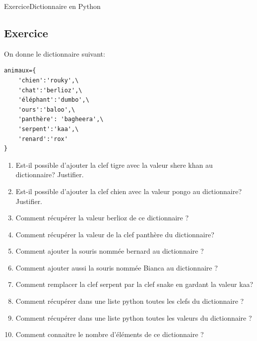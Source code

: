 \documentclass[11pt,a4paper]{article}
\newcounter{numexo}
\begin{document}
\begin{NSI}
{Exercice}{Dictionnaire en Python}
\end{NSI}


\addtocounter{numexo}{1}
\subsection*{\Large Exercice \thenumexo}
On donne le dictionnaire suivant:

\begin{lstlisting}
animaux={
	'chien':'rouky',\
	'chat':'berlioz',\
	'éléphant':'dumbo',\
	'ours':'baloo',\
	'panthère': 'bagheera',\
	'serpent':'kaa',\
	'renard':'rox'
}
\end{lstlisting}

\begin{enumerate}
\item Est-il possible d'ajouter la clef \textsf{tigre} avec la valeur \textsf{shere khan} au dictionnaire? Justifier.
\item Est-il possible d'ajouter la clef \textsf{chien} avec la valeur \textsf{pongo} au dictionnaire? Justifier.
\item Comment récupérer la valeur \textsf{berlioz} de ce dictionnaire ?
\item Comment récupérer la valeur de la clef \textsf{panthère} du dictionnaire?
\item Comment ajouter la souris nommée \textsf{bernard} au dictionnaire ?
\item Comment ajouter aussi la souris nommée \textsf{Bianca} au dictionnaire ?
\item Comment remplacer la clef \textsf{serpent} par la clef \textsf{snake} en gardant la valeur \textsf{kaa}?
\item Comment récupérer dans une liste python toutes les clefs du dictionnaire ?
\item Comment récupérer dans une liste python toutes les valeurs du dictionnaire ?
\item Comment connaitre le nombre d'éléments de ce dictionnaire ?
\end{enumerate}

\addtocounter{numexo}{1}
\end{document}

